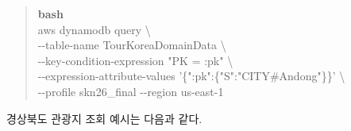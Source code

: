 \documentclass[12pt,a4paper]{article}
\newcommand{\DocNeedspace}[1]{\par\ifdim\dimexpr\pagegoal-\pagetotal\relax<#1\newpage\fi}
\begin{document}
\DocNeedspace{7\baselineskip}
\begin{quote}
\begin{scriptsize}
\ttfamily
\RaggedRight
\setlength{\parskip}{1pt}
\textcolor{LovvGreen}{\textbf{bash}}\\[0.2em]
aws dynamodb query \textbackslash{}\\
\hspace*{1.10em}-\allowbreak{}-\allowbreak{}table-\allowbreak{}name Tour\allowbreak{}Korea\allowbreak{}Domain\allowbreak{}Data \textbackslash{}\\
\hspace*{1.10em}-\allowbreak{}-\allowbreak{}key-\allowbreak{}condition-\allowbreak{}expression "PK = :\allowbreak{}pk" \textbackslash{}\\
\hspace*{1.10em}-\allowbreak{}-\allowbreak{}expression-\allowbreak{}attribute-\allowbreak{}values '\{\allowbreak{}":\allowbreak{}pk":\allowbreak{}\{\allowbreak{}"S":\allowbreak{}"CITY\#\allowbreak{}Andong"\allowbreak{}\}\allowbreak{}\}' \textbackslash{}\\
\hspace*{1.10em}-\allowbreak{}-\allowbreak{}profile skn26\_\allowbreak{}final -\allowbreak{}-\allowbreak{}region us-\allowbreak{}east-\allowbreak{}1\\
\end{scriptsize}
\end{quote}


\DocNeedspace{3\baselineskip}
경상북도 관광지 조회 예시는 다음과 같다.
\end{document}
